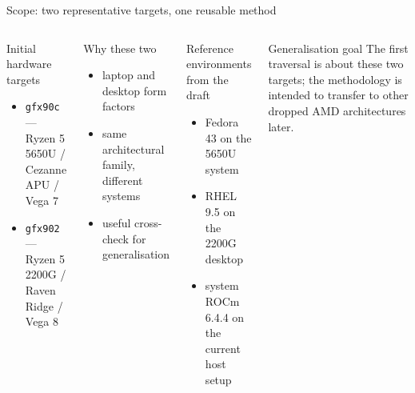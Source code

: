 \documentclass[aspectratio=169,11pt]{beamer}
\newcommand{\mono}[1]{\texttt{#1}}
\begin{document}
\begin{frame}[shrink=8]{Scope: two representative targets, one reusable method}
    \begin{columns}[T,onlytextwidth]
        \begin{block}{Initial hardware targets}
            \begin{itemize}
                \item \mono{gfx90c} — Ryzen 5 5650U / Cezanne APU / Vega 7
                \item \mono{gfx902} — Ryzen 5 2200G / Raven Ridge / Vega 8
            \end{itemize}
        \end{block}

        \begin{block}{Why these two}
            \begin{itemize}
                \item laptop and desktop form factors
                \item same architectural family, different systems
                \item useful cross-check for generalisation
            \end{itemize}
        \end{block}

        \begin{block}{Reference environments from the draft}
            \begin{itemize}
                \item Fedora 43 on the 5650U system
                \item RHEL 9.5 on the 2200G desktop
                \item system ROCm 6.4.4 on the current host setup
            \end{itemize}
        \end{block}

        \begin{block}{Generalisation goal}
            The first traversal is about these two targets; the methodology is intended to transfer to other dropped AMD architectures later.
        \end{block}
    \end{columns}
\end{frame}
\end{document}
